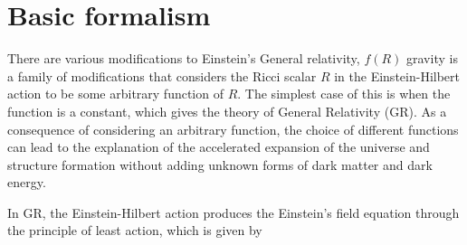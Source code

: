 \documentclass[12pt,a4paper,oneside]{book}
\begin{document}
\section{Basic formalism}
There are various modifications to Einstein's General relativity, $f(R)$ gravity is a family of modifications that considers the Ricci scalar $R$ in the Einstein-Hilbert action to be some arbitrary function of $R$. The simplest case of this is when the function is a constant, which gives the theory of General Relativity (GR). As a consequence of considering an arbitrary function, the choice of different functions can lead to the explanation of the accelerated expansion of the universe and structure formation without adding unknown forms of dark matter and dark energy. 

In GR, the Einstein-Hilbert action produces the Einstein's field equation through the principle of least action, which is given by \cite{Misner_Thorne_Wheeler_73}
\end{document}
